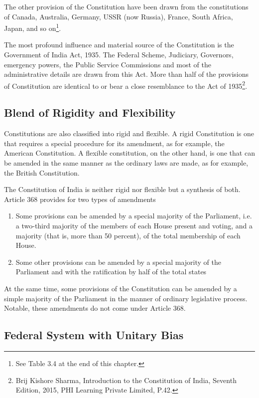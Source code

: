 The other provision of the Constitution have been drawn from the constitutions of Canada, Australia, Germany, USSR (now Russia), France, South Africa, Japan, and so on\footnote{See Table 3.4 at the end of this chapter.}.

The most profound influence and material source of the Constitution is the Government of India Act, 1935. The Federal Scheme, Judiciary, Governors, emergency powers, the Public Service Commissions and most of the administrative details are drawn from this Act. More than half of the provisions of Constitution are identical to or bear a close resemblance to the Act of 1935\footnote{Brij Kishore Sharma, Introduction to the Constitution of India, Seventh Edition, 2015, PHI Learning Private Limited, P.42.}.

\subsection{Blend of Rigidity and Flexibility}

Constitutions are also classified into rigid and flexible. A rigid Constitution is one that requires a special procedure for its amendment, as for example, the American Constitution. A flexible constitution, on the other hand, is one that can be amended in the same manner as the ordinary laws are made, as for example, the British Constitution.

The Constitution of India is neither rigid nor flexible but a synthesis of both. Article 368 provides for two types of amendments

\renewcommand{\labelenumi}{\textbf{(\alph{enumi})}}
\begin{enumerate}
  \item Some provisions can be amended by a special majority of the Parliament, i.e. a two-third majority of the members of each House present and voting, and a majority (that is, more than 50 percent), of the total membership of each House.
  \item Some other provisions can be amended by a special majority of the Parliament and with the ratification by half of the total states
\end{enumerate}

At the same time, some provisions of the Constitution can be amended by a simple majority of the Parliament in the manner of ordinary legislative process. Notable, these amendments do not come under Article 368.

\subsection{Federal System with Unitary Bias}

